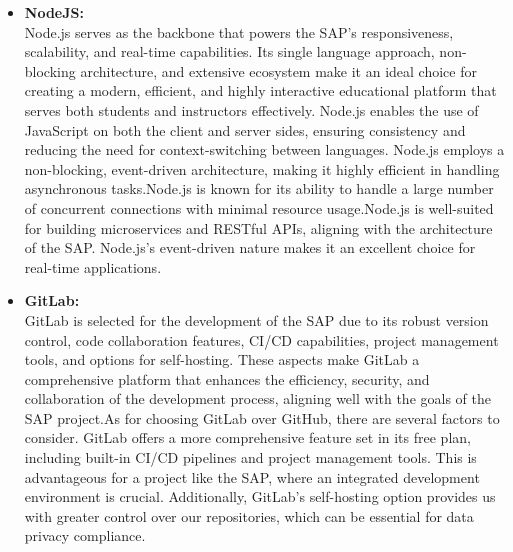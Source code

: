\begin{itemize}
    \item \textbf{NodeJS:}\\
    Node.js serves as the backbone that powers the SAP's responsiveness, scalability, and real-time capabilities. Its single language approach, non-blocking architecture, and extensive ecosystem make it an ideal choice for creating a modern, efficient, and highly interactive educational platform that serves both students and instructors effectively. Node.js enables the use of JavaScript on both the client and server sides, ensuring consistency and reducing the need for context-switching between languages.  Node.js employs a non-blocking, event-driven architecture, making it highly efficient in handling asynchronous tasks.Node.js is known for its ability to handle a large number of concurrent connections with minimal resource usage.Node.js is well-suited for building microservices and RESTful APIs, aligning with the architecture of the SAP. Node.js's event-driven nature makes it an excellent choice for real-time applications.\cite{node}
    \item \textbf{GitLab:}\\
    GitLab is selected for the development of the SAP due to its robust version control, code collaboration features, CI/CD capabilities, project management tools, and options for self-hosting. These aspects make GitLab a comprehensive platform that enhances the efficiency, security, and collaboration of the development process, aligning well with the goals of the SAP project.As for choosing GitLab over GitHub, there are several factors to consider. GitLab offers a more comprehensive feature set in its free plan, including built-in CI/CD pipelines and project management tools. This is advantageous for a project like the SAP, where an integrated development environment is crucial. Additionally, GitLab's self-hosting option provides us with greater control over our repositories, which can be essential for data privacy compliance.\cite{gitlab}
\end{itemize}
\newpage